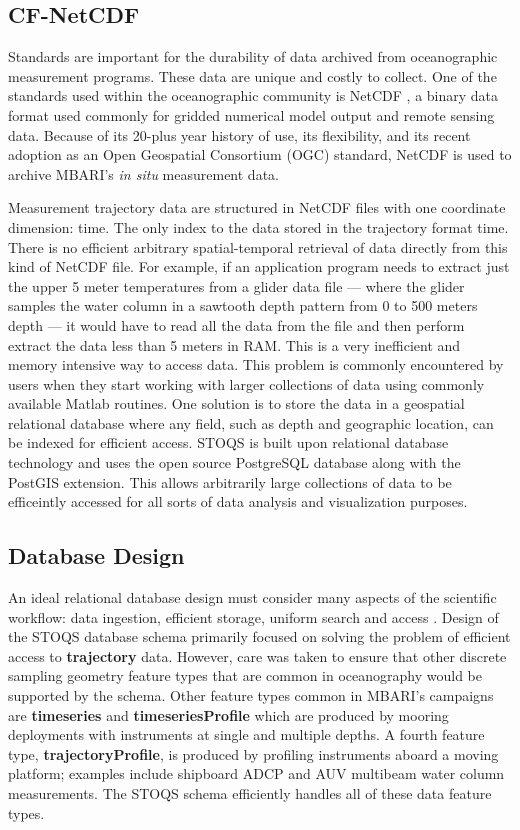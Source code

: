 \documentclass[conference]{IEEEtran}
\begin{document}
\subsection{CF-NetCDF}

Standards are important for the durability of data archived from oceanographic measurement programs. 
These data are unique and costly to collect. One of the standards used within 
the oceanographic community is NetCDF \cite{Rew1990}, a binary data format used 
commonly for gridded numerical model output and remote sensing data. Because of its 
20-plus year history of use, its flexibility, and its recent adoption as an 
Open Geospatial Consortium (OGC) standard, NetCDF is used to archive MBARI's 
\textit{in situ} measurement data.

Measurement trajectory data are
structured in NetCDF files with one coordinate dimension: time. 
The only index to the data stored in the trajectory format time. 
There is no efficient arbitrary spatial-temporal retrieval of 
data directly from this kind of NetCDF file. For example, 
if an application program needs to extract just the upper 5 meter temperatures from 
a glider data file --- where the glider samples the water column in a sawtooth 
depth pattern from 0 to 500 meters depth --- it would have to read all 
the data from the file and then perform extract the data less than 5 meters in RAM. 
This is a very 
inefficient and memory intensive way to access data. This problem is commonly
encountered by users when they start working with larger collections of data 
using commonly available Matlab routines. One solution is to store 
the data in a geospatial relational database where any field, such as depth 
and geographic location, can be indexed for efficient access.
STOQS is built 
upon relational database technology and uses the open source PostgreSQL 
database along with the PostGIS extension. This allows arbitrarily large collections
of data to be efficeintly accessed for all sorts of data analysis and visualization
purposes.

\subsection{Database Design}
An ideal relational database design must consider many aspects of the scientific 
workflow: data ingestion, efficient storage, uniform search and access 
\cite{Bechini:2013:MSS:2425433.2425647}. Design of the STOQS database schema primarily 
focused on solving the problem of efficient access to \textbf{trajectory} data. 
However, care was taken to ensure that other discrete sampling geometry feature types 
\cite{DSG} that are common in oceanography would be supported by the schema.  Other 
feature types common in MBARI's campaigns are \textbf{timeseries} and \textbf{timeseriesProfile} 
which are produced by mooring deployments with instruments at single and multiple depths. 
A fourth feature type, \textbf{trajectoryProfile}, is produced by profiling instruments 
aboard a moving platform; examples include shipboard ADCP and AUV multibeam water column 
measurements. The STOQS schema efficiently handles all of these data feature types.
\end{document}
